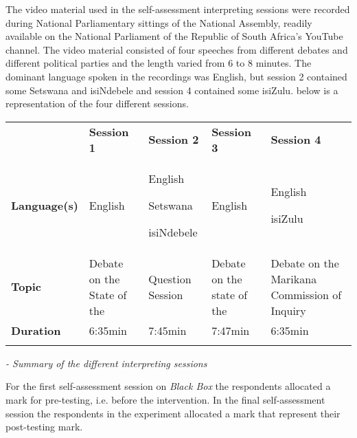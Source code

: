 \documentclass[output=paper]{langsci/langscibook}
\begin{document}
The video material used in the self-assessment interpreting sessions were recorded during National Parliamentary sittings of the National Assembly, readily available on the National Parliament of the Republic of South Africa’s YouTube channel. The video material consisted of four speeches from different debates and different political parties and the length varied from 6 to 8 minutes. The dominant language spoken in the recordings was English, but session 2 contained some Setswana and isiNdebele and session 4 contained some isiZulu.  below is a representation of the four different sessions.


\begin{tabularx}{\textwidth}{XXXXX} & \textbf{Session 1} & \textbf{Session 2} & \textbf{Session 3} & \textbf{Session 4}\\
\lsptoprule
\textbf{Language(s)} & English & English

Setswana

isiNdebele & English & English

isiZulu\\
\textbf{Topic} & Debate on the State of the \citealt{Nation2016} & Question Session & Debate on the state of the \citealt{Nation2016} & Debate on the Marikana Commission of Inquiry\\
\textbf{Duration} & 6:35min & 7:45min & 7:47min & 6:35min\\
\lspbottomrule
\end{tabularx}
\textit{- Summary of the different interpreting sessions}

For the first self-assessment session on \textit{Black Box} the respondents allocated a mark for pre-testing, i.e. before the intervention. In the final self-assessment session the respondents in the experiment allocated a mark that represent their post-testing mark. 
\end{document}
